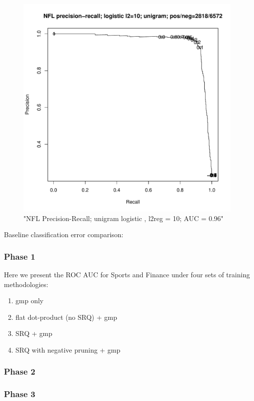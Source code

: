 \begin{figure}[H]
\centering
\includegraphics[scale=0.5]{PRcurve_nfl.pdf}
\caption{"NFL Precision-Recall; unigram logistic , l2reg = 10; AUC = 0.96"}
\end{figure}

Baseline classification error comparison:


\subsubsection{Phase 1}
Here we present the ROC AUC for Sports and Finance under four sets of training methodologies:
\begin{enumerate}
\item gmp only
\item flat dot-product (no SRQ) + gmp
\item SRQ + gmp
\item SRQ with negative pruning + gmp
\end{enumerate}


\subsubsection{Phase 2}

\subsubsection{Phase 3}

